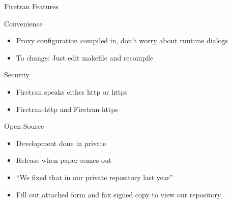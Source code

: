\begin{frame}[fragile]{Firetran Features}

\begin{block}{Convenience}
 \begin{itemize}
  \item Proxy configuration compiled in, don't worry about runtime dialogs
  \item To change: Just edit makefile and recompile
 \end{itemize}
\end{block}


\begin{block}{Security}
 \begin{itemize}
  \item Firetran speaks either http or https
  \item Firetran-http and Firetran-https
 \end{itemize}
\end{block}

\begin{block}{Open Source}
 \begin{itemize}
  \item Development done in private
  \item Release when paper comes out
  \item ``We fixed that in our private repository last year''
  \item Fill out attached form and fax signed copy to view our repository
 \end{itemize}
\end{block}

\end{frame}



